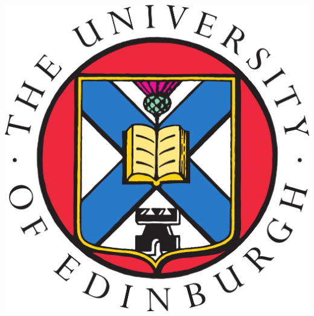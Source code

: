 \vspace{2cm}


\begin{center}
     {\includegraphics[scale=0.2]{figs/University_of_Edinburgh_logo}}
\end{center}

\newpage
